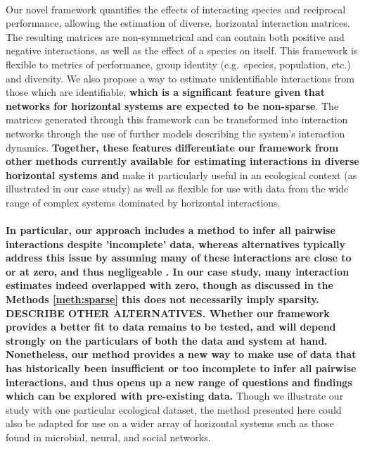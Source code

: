 \documentclass[a4,12pt]{article}
\begin{document}
\begin{refsection}
    \paragraph{} 
    Our novel framework quantifies the effects of interacting species and reciprocal performance, allowing the estimation of diverse, horizontal interaction matrices. The resulting matrices are non-symmetrical and can contain both positive and negative interactions, as well as the effect of a species on itself. This framework is flexible to metrics of performance, group identity (e.g.\ species, population, etc.) and diversity. We also propose a way to estimate unidentifiable interactions from those which are identifiable, \textbf{which is a significant feature given that networks for horizontal systems are expected to be non-sparse}. The matrices generated through this framework can be transformed into interaction networks through the use of further models describing the system's interaction dynamics. \textbf{Together, these features differentiate our framework from other methods currently available for estimating interactions in diverse horizontal systems and} make it particularly useful in an ecological context (as illustrated in our case study) as well as flexible for use with data from the wide range of complex systems dominated by horizontal interactions.

    \paragraph{}
    \textbf{In particular, our approach includes a method to infer all pairwise interactions despite 'incomplete' data, whereas alternatives typically address this issue by assuming many of these interactions are close to or at zero, and thus negligeable \parencite{}. In our case study, many interaction estimates indeed overlapped with zero, though as discussed in the Methods \ref{meth:sparse} this does not necessarily imply sparsity. DESCRIBE OTHER ALTERNATIVES. Whether our framework provides a better fit to data remains to be tested, and will depend strongly on the particulars of both the data and system at hand. Nonetheless, our method provides a new way to make use of data that has historically been insufficient or too incomplete to infer all pairwise interactions, and thus opens up a new range of questions and findings which can be explored with pre-existing data.}  Though we illustrate our study with one particular ecological dataset, the method presented here could also be adapted for use on a wider array of  horizontal systems such as those found in microbial, neural, and social networks. 


\end{refsection}
\end{document}
